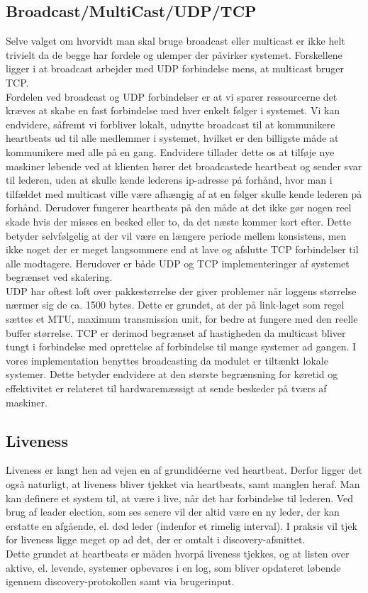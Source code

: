 \documentclass[a4paper,12pt]{article}
\begin{document}
\subsection{Broadcast/MultiCast/UDP/TCP}
Selve valget om hvorvidt man skal bruge broadcast eller multicast er ikke helt trivielt da de begge har fordele og ulemper der påvirker systemet. Forskellene ligger i at broadcast arbejder med UDP forbindelse mens, at multicast bruger TCP.
\\
Fordelen ved broadcast og UDP forbindelser er at vi sparer ressourcerne det kræves at skabe en fast forbindelse med hver enkelt følger i systemet. Vi kan endvidere, såfremt vi forbliver lokalt, udnytte broadcast til at kommunikere heartbeats ud til alle medlemmer i systemet, hvilket er den billigste måde at kommunikere med alle på en gang. Endvidere tillader dette os at tilføje nye maskiner løbende ved at klienten hører det broadcastede heartbeat og sender svar til lederen, uden at skulle kende lederens ip-adresse på forhånd, hvor man i tilfældet med multicast ville være afhængig af at en følger skulle kende lederen på forhånd. Derudover fungerer heartbeats på den måde at det ikke gør nogen reel skade hvis der misses en besked eller to, da det næste kommer kort efter. Dette betyder selvfølgelig at der vil være en længere periode mellem konsistens, men ikke noget der er meget langsommere end at lave og afslutte TCP forbindelser til alle modtagere.
Herudover er både UDP og TCP implementeringer af systemet begrænset ved skalering.
\\[5px]
UDP har oftest loft over pakkestørrelse der giver problemer når loggens størrelse nærmer sig de ca. 1500 bytes. Dette er grundet, at der på link-laget som regel sættes et MTU, maximum transmission unit, for bedre at fungere med den reelle buffer størrelse. TCP er derimod begrænset af hastigheden da multicast bliver tungt i forbindelse med oprettelse af forbindelse til mange systemer ad gangen. 
I vores implementation benyttes broadcasting da modulet er tiltænkt lokale systemer.
Dette betyder endvidere at den største begrænsning for køretid og effektivitet er relateret til hardwaremæssigt at sende beskeder på tværs af maskiner.

\subsection{Liveness} 
Liveness er langt hen ad vejen en af grundidéerne ved heartbeat. Derfor ligger det også naturligt, at liveness bliver tjekket via heartbeats, samt manglen heraf. Man kan definere et system til, at være i live, når det har forbindelse til lederen. Ved brug af leader election, som ses senere vil der altid være en ny leder, der kan erstatte en afgående, el. død leder (indenfor et rimelig interval). I praksis vil tjek for liveness ligge meget op ad det, der er omtalt i discovery-afsnittet.
\\
Dette grundet at heartbeats er måden hvorpå liveness tjekkes, og at listen over aktive, el. levende, systemer opbevares i en log, som bliver opdateret løbende igennem discovery-protokollen samt via brugerinput.
\end{document}
